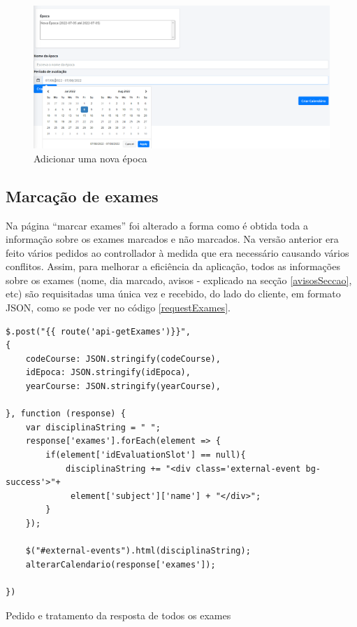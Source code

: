 \documentclass[12pt, twoside]{report}
\begin{document}
	\begin{figure}[H] 
		\centering
		\includegraphics[width=1\textwidth,height=1\textheight,keepaspectratio]{image/criarEpoca}
		\caption{Adicionar uma nova época}
		\label{criarEpoca}
		
	\end{figure}

	\subsection{Marcação de exames}	
	
	Na página ``marcar exames'' foi alterado a forma como é obtida toda a informação sobre os exames marcados e não marcados. Na versão anterior era feito vários pedidos ao controllador à medida que era necessário causando vários conflitos. Assim, para melhorar a eficiência da aplicação, todos as informações sobre os exames (nome, dia marcado, avisos - explicado na secção \ref{avisosSeccao}, etc) são requisitadas uma única vez e recebido, do lado do cliente, em formato JSON, como se pode ver no código \ref{requestExames}.
	
	\begin{listing}[H]
		\begin{verbatim}
$.post("{{ route('api-getExames')}}",
{
	codeCourse: JSON.stringify(codeCourse),
	idEpoca: JSON.stringify(idEpoca),
	yearCourse: JSON.stringify(yearCourse),
			
}, function (response) {	
	var disciplinaString = " ";
	response['exames'].forEach(element => {
		if(element['idEvaluationSlot'] == null){
			disciplinaString += "<div class='external-event bg-success'>"+
			 element['subject']['name'] + "</div>";
		}
	});
		
	$("#external-events").html(disciplinaString);
	alterarCalendario(response['exames']);
			
})
	\end{verbatim}
	\caption{Pedido e tratamento da resposta de todos os exames}
	\label{requestExames}
	\end{listing}
\end{document}
